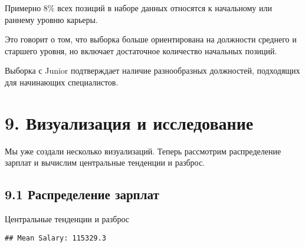 \documentclass[
]{article}
\newenvironment{Shaded}{\begin{snugshade}}{\end{snugshade}}
\newcommand{\AttributeTok}[1]{\textcolor[rgb]{0.13,0.29,0.53}{#1}}
\newcommand{\CommentTok}[1]{\textcolor[rgb]{0.56,0.35,0.01}{\textit{#1}}}
\newcommand{\ConstantTok}[1]{\textcolor[rgb]{0.56,0.35,0.01}{#1}}
\newcommand{\FunctionTok}[1]{\textcolor[rgb]{0.13,0.29,0.53}{\textbf{#1}}}
\newcommand{\NormalTok}[1]{#1}
\newcommand{\OtherTok}[1]{\textcolor[rgb]{0.56,0.35,0.01}{#1}}
\newcommand{\SpecialCharTok}[1]{\textcolor[rgb]{0.81,0.36,0.00}{\textbf{#1}}}
\newcommand{\StringTok}[1]{\textcolor[rgb]{0.31,0.60,0.02}{#1}}
\begin{document}
Примерно 8\% всех позиций в наборе данных относятся к начальному или
раннему уровню карьеры.

Это говорит о том, что выборка больше ориентирована на должности
среднего и старшего уровня, но включает достаточное количество начальных
позиций.

Выборка с Junior подтверждает наличие разнообразных должностей,
подходящих для начинающих специалистов.

\section{9. Визуализация и
исследование}\label{ux432ux438ux437ux443ux430ux43bux438ux437ux430ux446ux438ux44f-ux438-ux438ux441ux441ux43bux435ux434ux43eux432ux430ux43dux438ux435}

Мы уже создали несколько визуализаций. Теперь рассмотрим распределение
зарплат и вычислим центральные тенденции и разброс.

\subsection{9.1 Распределение
зарплат}\label{ux440ux430ux441ux43fux440ux435ux434ux435ux43bux435ux43dux438ux435-ux437ux430ux440ux43fux43bux430ux442}

Центральные тенденции и разброс

\begin{Shaded}
\end{Shaded}

\begin{verbatim}
## Mean Salary: 115329.3
\end{verbatim}
\end{document}
